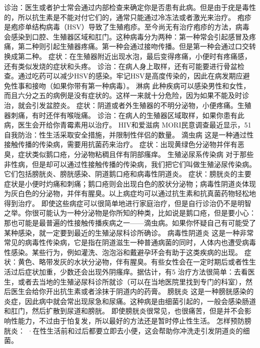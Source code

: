 \documentclass[12pt,UTF8]{ctexbook}
\begin{document}
诊治：医生或者护士常会通过内部检查来确定你是否患有此病。但是由于疣是毒性的，所以抗生素是不能对付它们的，通常只能通过冷冻法或者激光来治疗。
疱疹
是疱疹单结构病毒（HSV）导致了生殖疱疹。至今尚无有治疗疱疹的方法，病毒会感染到口腔、生殖器区域和肛门。这种病毒分为两种：第一种常会引起感冒及疼痛，第二种则引起生殖器疼痛。第一种会通过接吻传播。但是第一种会通过口交转换成第二种。
症状：在生殖器附近出现水泡，最后变得疼痛，小便时有疼痛感，还有类似发烧的症状和头疼。
诊治：在病人身上取样，还有可能要进行骨盆检查。通过吃药可以减少HSV的感染。牢记HSV是高度传染的，因此在病发期应避免性事和接吻（如果你带有第一种病毒）。
淋病
此种疾病可以感染男性和女性，而且六分之五的病例是没有症状的。这样一来就十分危险，因为如果不能及时诊治，就会引发盆腔炎。
症状：阴道或者外生殖器的不明分泌物，小便疼痛。生殖器刺痛，有时还伴有喉咙痛。
诊治：在病人的生殖器区域取样，如果你患有此病，医生会开给你青霉素用以治疗。
HIV和爱滋病
MORI民意调查最近显示，51%
自我防治：性生活采取安全措施，并限制性伴侣的数量。
滴虫病
这是一种通过性接触传播的传染病，需要用抗菌药来治疗。
症状：出现黄绿色分泌物并伴有恶臭，症状类似鹅口疮，分泌物粘稠且伴有阴部瘙痒。
生殖泌尿系传染病
对于那些非性病，但是却可以通过性接触传播的传染病，我们把它们叫做生殖泌尿传染病。它们包括膀胱炎、膀胱感染、阴道鹅口疮和病毒性阴道炎。
症状：膀胱炎的主要症状是小便时灼痛和刺痛；鹅口疮则会出现白色的胶状分泌物；病毒性阴道炎体现为灰白色的分泌物，并伴有腥臭。以上病症均可以通过抗生素和抗真菌药物轻松地得到治疗。
即使这些病症可以很简单地进行家庭治疗，但是自行诊治仍不是明智之举。你很可能认为一种分泌物是你所知的种类，比如说是鹅口疮，但是要小心：那也可能是最普遍的性接触传播疾病之一——滴虫病。如果你怀疑自己有可能受了某种感染，就一定要到最近的生殖泌尿科诊所确诊。
病毒性阴道炎
这是一种非常常见的病毒性传染病，它是指在阴道滋生一种普通病菌的同时，人体内也遭受病毒性感染。某些行为，例如灌洗、泡泡浴和戴避孕环会有助于这类疾病的出现。
症状：黄色、略带发灰的水状分泌物，伴有腥臭。有些女性会在一定时期后或者性生活过后症状加重，少数还会出现外阴瘙痒。据估计，有5%
治疗方法很简单：去看医生，或者去当地的生殖泌尿科诊所就诊（可以在当地医院里找到专门的科室），然后医生会给你开出抗生素或者涂抹于阴道内的药膏。
膀胱炎
这是一种膀胱感染的炎症，因此病中就会常出现尿急和尿痛。这种病是由细菌引起的，一般会感染肠道和肛门，然后扩散到尿道和膀胱。
即使膀胱炎很常见，也很痛苦，但是并不会影响性能力，不过由于怕复发，所以最好的方法还是暂时停止性生活。
怎样预防膀胱炎：
·在性生活前和过后都要立即去小便，这会帮助你冲洗走引发阴道炎的细菌。
\end{document}

